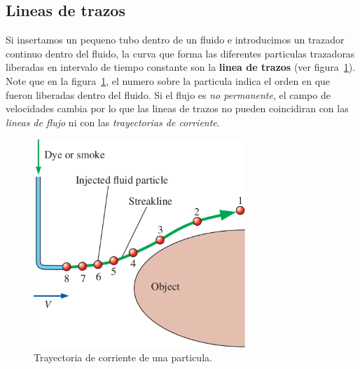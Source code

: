 \documentclass[10pt, oneside]{article}
\begin{document}
\subsection{Lineas de trazos}
Si insertamos un pequeno tubo dentro de un fluido e introducimos un  trazador continuo dentro del fluido, la curva que forma las diferentes particulas trazadoras liberadas en intervalo de tiempo constante son la \textbf{linea de trazos} (ver figura~\ref{litra}). Note que en la figura~\ref{litra}, el numero sobre la particula indica el orden en que fueron liberadas dentro del fluido. Si el flujo es \emph{no permanente}, el campo de velocidades cambia por lo que las lineas de trazos no pueden coincidiran con las \emph{lineas de flujo} ni con las \emph{trayectorias de corriente}. 
\begin{figure}[h]
\centering
\includegraphics[width=8cm]{litra}
\caption{Trayectoria de corriente de una particula.}
\label{litra}
\end{figure}
\end{document}
